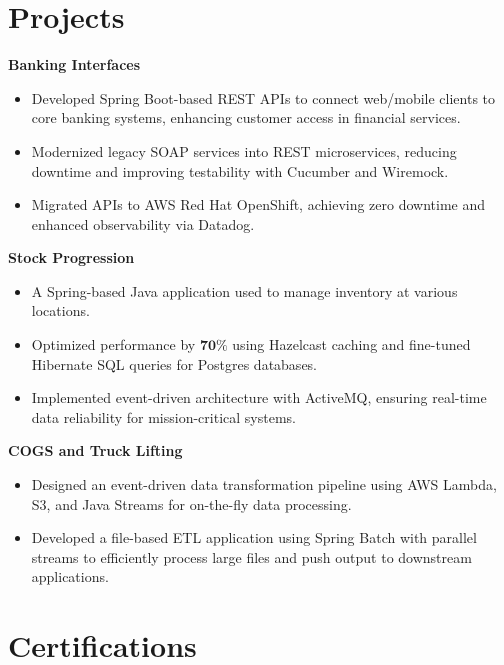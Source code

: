 \documentclass[a4paper,12pt]{article}
\begin{document}
\section{Projects}
\textbf{Banking Interfaces}
\vspace{2pt}
\begin{itemize}[nosep, leftmargin=1em, itemsep=3pt,label=--]
    \item Developed Spring Boot-based REST APIs to connect web/mobile clients to core banking systems, enhancing customer access in financial services.
    \item Modernized legacy SOAP services into REST microservices, reducing downtime and improving testability with Cucumber and Wiremock.
    \item Migrated APIs to AWS Red Hat OpenShift, achieving zero downtime and enhanced observability via Datadog.
\end{itemize}

\textbf{Stock Progression}
\vspace{2pt}
\begin{itemize}[nosep, leftmargin=1em, itemsep=3pt,label=--]
    \item A Spring-based Java application used to manage inventory at various locations.
    \item Optimized performance by $\mathbf{70\%}$ using Hazelcast caching and fine-tuned Hibernate SQL queries for Postgres databases.
    \item Implemented event-driven architecture with ActiveMQ, ensuring real-time data reliability for mission-critical systems.
\end{itemize}

\textbf{COGS and Truck Lifting}
\vspace{2pt}
\begin{itemize}[nosep, leftmargin=1em, itemsep=3pt,label=--]
    \item Designed an event-driven data transformation pipeline using AWS Lambda, S3, and Java Streams for on-the-fly data processing.
    \item Developed a file-based ETL application using Spring Batch with parallel streams to efficiently process large files and push output to downstream applications.
\end{itemize}
\section{Certifications}
\end{document}
